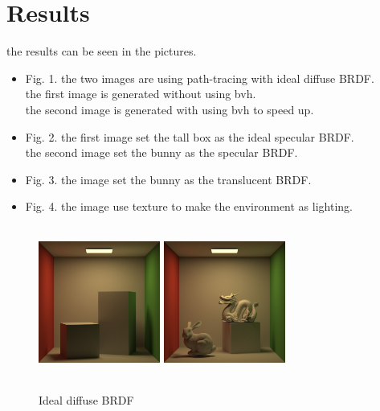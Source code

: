 \documentclass[acmtog]{acmart}
\begin{document}
\section{Results}
the results can be seen in the pictures.
\begin{itemize}
	\item Fig. 1. the two images are using path-tracing with ideal diffuse BRDF.\\
	the first image is generated without using bvh.\\
	the second image is generated with using bvh to speed up.\\

	\item Fig. 2. the first image set the tall box as the ideal specular BRDF.\\
	the second image set the bunny as the specular BRDF.\\

	\item Fig. 3. the image set the bunny as the translucent BRDF.\\

	\item Fig. 4. the image use texture to make the environment as lighting.
\end{itemize}

\begin{figure}[h]
	\centering
	\includegraphics[width=4cm,height=5cm]{without_bvh}
	\includegraphics[width=4cm,height=5cm]{with_bvh}
	\caption{Ideal diffuse BRDF}
\end{figure}
\end{document}
